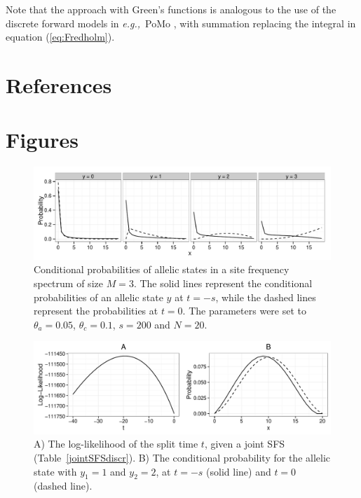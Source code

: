 \documentclass[preprint]{elsarticle}
\newcommand\eg{{\it e.g.,}}
\begin{document}
Note that the approach with Green's functions is analogous to the use of the discrete forward models in \eg\ PoMo \citep{Schrempf2016}, with summation replacing the integral in equation (\ref{eq:Fredholm}).

\section*{References}



\newpage

\section*{Figures}

\begin{figure}[ht]
\includegraphics[width = 12cm]{cProb.pdf}
\caption{Conditional probabilities of allelic states in a site frequency spectrum of size $M=3$. The solid lines represent the conditional probabilities of an allelic state $y$ at $t=-s$, while the dashed lines represent the probabilities at $t=0$. The parameters were set to $\theta_a=0.05$, $\theta_c=0.1$, $s=200$ and $N=20$.}\label{cProb}
\end{figure}

\begin{figure}[ht]
\includegraphics[width = 12cm]{twoPop_14_7_2016.pdf}
\caption{A) The log-likelihood of the split time $t$, given a joint SFS (Table~\ref{jointSFSdiscr}). B) The conditional probability for the allelic state with $y_1=1$ and $y_2=2$, at $t=-s$ (solid line) and $t=0$ (dashed line).}\label{twoPopdiscr}
\end{figure}
\end{document}
